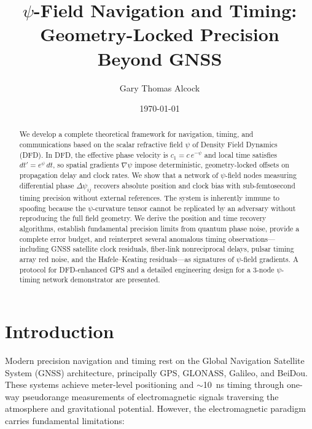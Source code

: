 \documentclass[aps,prd,twocolumn,superscriptaddress,nofootinbib]{revtex4-2}
\begin{document}
\title{$\psi$-Field Navigation and Timing:\\
Geometry-Locked Precision Beyond GNSS}

\author{Gary Thomas Alcock}

\date{\today}

\begin{abstract}
We develop a complete theoretical framework for navigation, timing, and
communications based on the scalar refractive field $\psi$ of Density Field
Dynamics (DFD). In DFD, the effective phase velocity is
$c_1 = c\,e^{-\psi}$ and local time satisfies $dt' = e^{\psi}\,dt$, so
spatial gradients $\nabla\psi$ impose deterministic, geometry-locked offsets
on propagation delay and clock rates. We show that a network of $\psi$-field
nodes measuring differential phase $\Delta\psi_{ij}$ recovers absolute
position and clock bias with sub-femtosecond timing precision without
external references. The system is inherently immune to spoofing because the
$\psi$-curvature tensor cannot be replicated by an adversary without
reproducing the full field geometry. We derive the position and time recovery
algorithms, establish fundamental precision limits from quantum phase noise,
provide a complete error budget, and reinterpret several anomalous timing
observations---including GNSS satellite clock residuals, fiber-link
nonreciprocal delays, pulsar timing array red noise, and the
Hafele--Keating residuals---as signatures of $\psi$-field gradients. A
protocol for DFD-enhanced GPS and a detailed engineering design for a
3-node $\psi$-timing network demonstrator are presented.
\end{abstract}

\maketitle

\section{Introduction}\label{sec:intro}

Modern precision navigation and timing rest on the Global Navigation
Satellite System (GNSS) architecture, principally GPS, GLONASS, Galileo,
and BeiDou. These systems achieve meter-level positioning and
$\sim$10~ns timing through one-way pseudorange measurements of
electromagnetic signals traversing the atmosphere and gravitational
potential. However, the electromagnetic paradigm carries fundamental
limitations:
\end{document}
